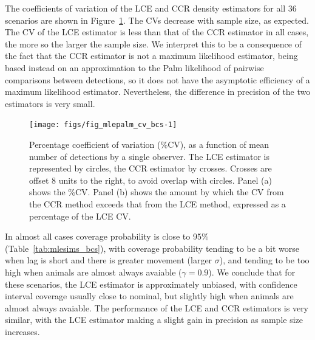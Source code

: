 \documentclass[useAMS, usenatbib, referee]{biom}\usepackage[]{graphicx}\usepackage[]{color}
\newenvironment{knitrout}{}{} %
\begin{document}
The coefficients of variation of the LCE and CCR density estimators for all 36 scenarios are shown in Figure~\ref{fig:fig_mlepalm_cv_bcs}. The CVs decrease with sample size, as expected. The CV of the LCE estimator is less than that of the CCR estimator in all cases, the more so the larger the sample size. We interpret this to be a consequence of the fact that the CCR estimator is not a maximum likelihood estimator, being based instead on an approximation to the Palm likelihood of pairwise comparisons between detections, so it does not have the asymptotic efficiency of a maximum likelihood estimator. Nevertheless, the difference in precision of the two estimators is very small.



\begin{knitrout}
\color{fgcolor}\begin{figure}

{\centering \texttt{[image: figs/fig\_mlepalm\_cv\_bcs-1]} 

}

\caption[Percentage coefficient of variation (\%CV), as a function of mean number of detections by a single observer]{Percentage coefficient of variation (\%CV), as a function of mean number of detections by a single observer. The LCE estimator is represented by circles, the CCR estimator by crosses. Crosses are offset 8 units to the right, to avoid overlap with circles. Panel (a) shows the \%CV. Panel (b) shows the amount by which the CV from the CCR method exceeds that from the LCE method, expressed as a percentage of the LCE CV.}\label{fig:fig_mlepalm_cv_bcs}
\end{figure}


\end{knitrout}


In almost all cases coverage probability is close to 95\% (Table~\ref{tab:mlesims_bcs}), with coverage probability tending to be a bit worse when lag is short and there is greater movement (larger $\sigma$), and tending to be too high when animals are almost always avaiable ($\gamma=0.9$). We conclude that for these scenarios, the LCE estimator is approximately unbiased, with confidence interval coverage usually close to nominal, but slightly high when animals are almost always avaiable. The performance of the LCE and CCR estimators is very similar, with the LCE estimator making a slight gain in precision as sample size increases.
\end{document}
